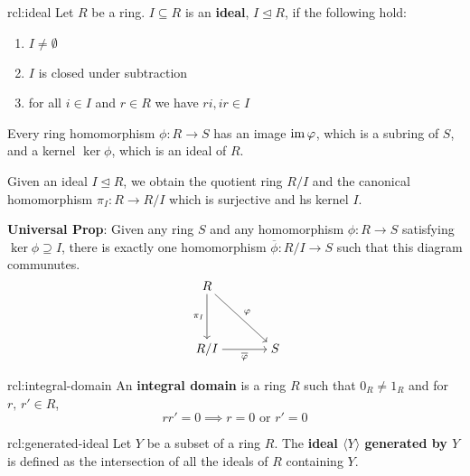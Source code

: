 \documentclass[landscape, 8pt]{extarticle}
\begin{document}
\begin{multicols}{3}

\begin{rcl}{rcl:ideal}{}
    Let $R$ be a ring. $I \subseteq R$ is an \textbf{ideal}, $I \unlhd R$, if the following hold:
    \begin{enumerate}
        \setlength\itemsep{0em}
        \item $I \ne \emptyset$
        \item $I$ is closed under subtraction
        \item for all $i\in I$ and $r\in R$ we have $ri, ir\in I$
    \end{enumerate}
    Every ring homomorphism $\phi : R \to S$ has an image $\operatorname{im} \varphi$, which is a subring of $S$, and a kernel $\ker \phi$, which is an ideal of $R$.

    \longrule{0.08ex}

    Given an ideal $I \unlhd R$, we obtain the quotient ring $R / I$ and the canonical homomorphism $\pi_{I} : R \to R /I$ which is surjective and hs kernel $I$. 

    \textbf{Universal Prop}: Given any ring $S$ and any homomorphism $\phi : R \to S$ satisfying $\ker \phi \supseteq I$, there is exactly one homomorphism $\overline{\phi} : R /I \to S$ such that this diagram communutes.
\[\begin{tikzcd}[cramped,column sep=scriptsize]
	R \\
	\\
	{R / I} && S
	\arrow["{\pi_I}"', from=1-1, to=3-1]
	\arrow["\phi", from=1-1, to=3-3]
	\arrow["{\overline{\phi}}"', from=3-1, to=3-3]
\end{tikzcd}\]
\end{rcl}

\begin{rcl}{rcl:integral-domain}{}
    An \textbf{integral domain} is a ring $R$ such that $0_{R} \ne 1_{R}$ and for $r,\,r'\in R$,
    \[rr' = 0 \implies r = 0 \text{ or } r' = 0\]
\end{rcl}

\newpage
\begin{rcl}{rcl:generated-ideal}{}
    Let $Y$ be a subset of a ring $R$. The \textbf{ideal $\langle Y \rangle$ generated by $Y$} is defined as the intersection of all the ideals of $R$ containing $Y$.


\end{rcl}
\end{multicols}
\end{document}
